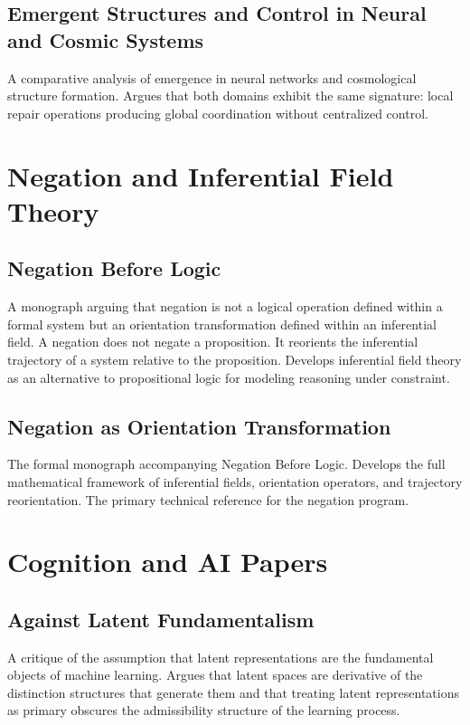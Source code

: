 \documentclass[12pt, openany]{book}
\begin{document}
\subsection{Emergent Structures and Control in Neural and Cosmic Systems}
A comparative analysis of emergence in neural networks and cosmological
structure formation. Argues that both domains exhibit the same signature:
local repair operations producing global coordination without centralized
control.

\section{Negation and Inferential Field Theory}

\subsection{Negation Before Logic} A monograph arguing that negation is
not a logical operation defined within a formal system but an orientation
transformation defined within an inferential field. A negation does not
negate a proposition. It reorients the inferential trajectory of a system
relative to the proposition. Develops inferential field theory as an
alternative to propositional logic for modeling reasoning under constraint.

\subsection{Negation as Orientation Transformation} The formal monograph
accompanying Negation Before Logic. Develops the full mathematical
framework of inferential fields, orientation operators, and trajectory
reorientation. The primary technical reference for the negation program.

\section{Cognition and AI Papers}

\subsection{Against Latent Fundamentalism} A critique of the assumption
that latent representations are the fundamental objects of machine learning.
Argues that latent spaces are derivative of the distinction structures that
generate them and that treating latent representations as primary obscures
the admissibility structure of the learning process.
\end{document}
